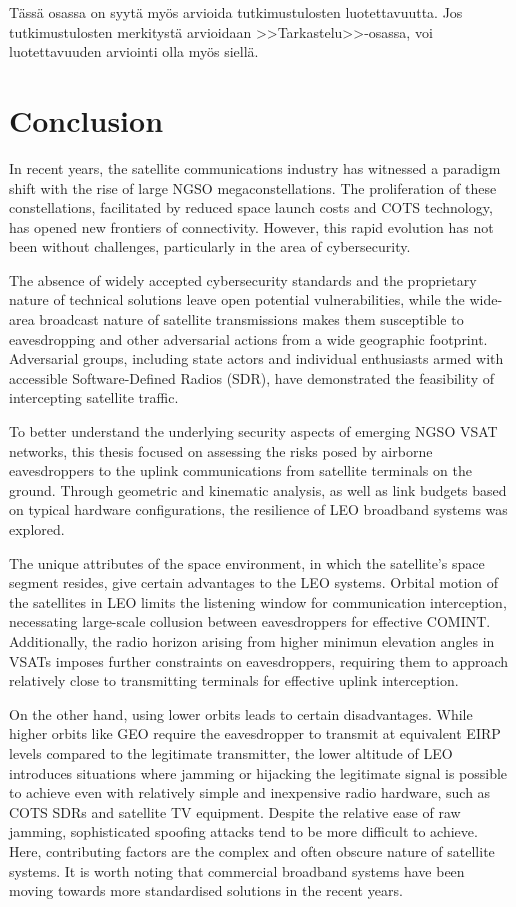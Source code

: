 \documentclass[english, 12pt, a4paper, elec, utf8, a-1b, online]{aaltothesis}
\begin{document}
T\"ass\"a osassa on syyt\"a my\"os arvioida tutkimustulosten luotettavuutta.
Jos tutkimustulosten merkityst\"a arvioidaan >>Tarkastelu>>-osassa,
voi luotettavuuden arviointi olla my\"os siell\"a.

\clearpage

\section{Conclusion}

In recent years, the satellite communications industry has witnessed a paradigm shift with the rise of large NGSO megaconstellations.
The proliferation of these constellations, facilitated by reduced space launch costs and COTS technology, has opened new frontiers of connectivity.
However, this rapid evolution has not been without challenges, particularly in the area of cybersecurity.

The absence of widely accepted cybersecurity standards and the proprietary nature of technical solutions leave open potential vulnerabilities, while the wide-area broadcast nature of satellite transmissions makes them susceptible to eavesdropping and other adversarial actions from a wide geographic footprint.
Adversarial groups, including state actors and individual enthusiasts armed with accessible Software-Defined Radios (SDR), have demonstrated the feasibility of intercepting satellite traffic.

To better understand the underlying security aspects of emerging NGSO VSAT networks, this thesis focused on assessing the risks posed by airborne eavesdroppers to the uplink communications from satellite terminals on the ground.
Through geometric and kinematic analysis, as well as link budgets based on typical hardware configurations, the resilience of LEO broadband systems was explored.

The unique attributes of the space environment, in which the satellite's space segment resides, give certain advantages to the LEO systems.
Orbital motion of the satellites in LEO limits the listening window for communication interception, necessating large-scale collusion between eavesdroppers for effective COMINT.
Additionally, the radio horizon  arising from higher minimun elevation angles in VSATs imposes further constraints on eavesdroppers, requiring them to approach relatively close to transmitting terminals for effective uplink interception.

On the other hand, using lower orbits leads to certain disadvantages.
While higher orbits like GEO require the eavesdropper to transmit at equivalent EIRP levels compared to the legitimate transmitter, the lower altitude of LEO introduces situations where jamming or hijacking the legitimate signal is possible to achieve even with relatively simple and inexpensive radio hardware, such as COTS SDRs and satellite TV equipment.
Despite the relative ease of raw jamming, sophisticated spoofing attacks tend to be more difficult to achieve. Here, contributing factors are the complex and often obscure nature of satellite systems.
It is worth noting that commercial broadband systems have been moving towards more standardised solutions in the recent years. 
\end{document}
